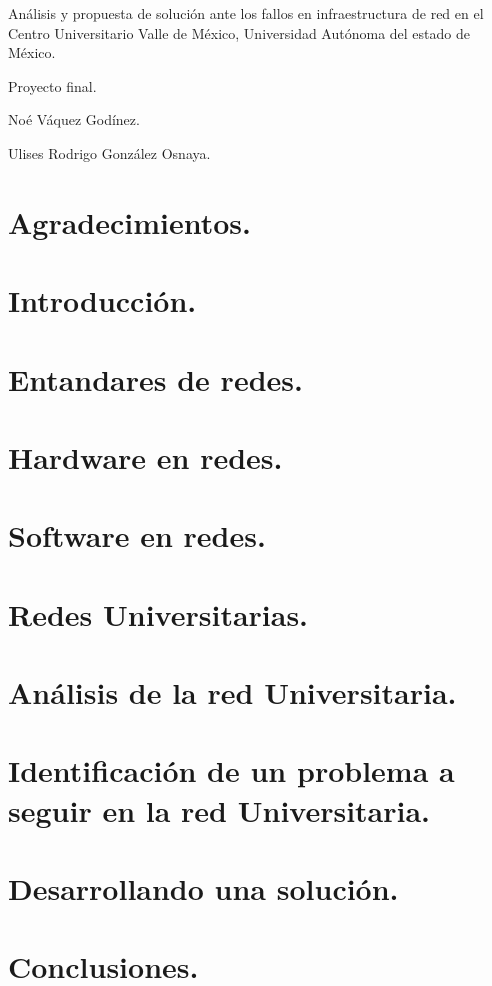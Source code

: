 \documentclass[12pt, letterpaper]{article}
\begin{document}
\newpage

Análisis y propuesta de solución ante los fallos en infraestructura de red 
en el Centro Universitario Valle de México, Universidad Autónoma del estado de México.\newline 
\begin{center}
Proyecto final.
\end{center}

\begin{flushright}
Noé Váquez Godínez.
\end{flushright}
\begin{flushright}
Ulises Rodrigo González Osnaya.
\end{flushright}
\newpage
\tableofcontents
\newpage
\section{Agradecimientos.}
\newpage
\section{Introducción.}
\newpage

\newpage
\section{Entandares de redes.}
\newpage
\section{Hardware en redes.}
\newpage
\section{Software en redes.}
\newpage
\section{Redes Universitarias.}
\newpage
\section{Análisis de la red Universitaria.}
\newpage
\section{Identificación de un problema a seguir en la red Universitaria.}
\newpage
\section{Desarrollando una solución.}
\newpage
\section{Conclusiones.}
\newpage


\end{document}
